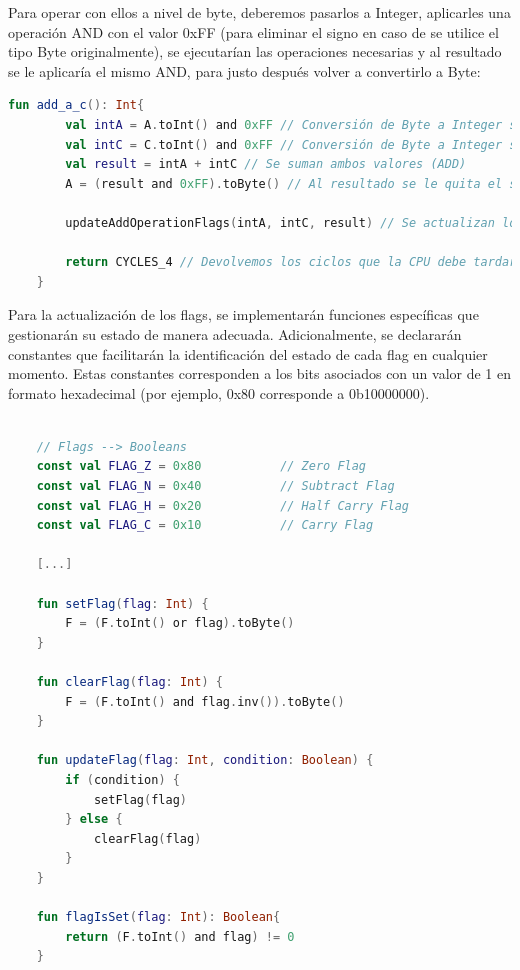 Para operar con ellos a nivel de byte, deberemos pasarlos a Integer, aplicarles una operación AND con el valor 0xFF (para eliminar el signo en caso de se utilice el tipo Byte originalmente), se ejecutarían las operaciones necesarias y al resultado se le aplicaría el mismo AND, para justo después volver a convertirlo a Byte:

\begin{lstlisting}[language=Kotlin, caption={Ejemplo de Opcode}, label={code:kotlinexample}]
    fun add_a_c(): Int{
        val intA = A.toInt() and 0xFF // Conversión de Byte a Integer sin signo -> A
        val intC = C.toInt() and 0xFF // Conversión de Byte a Integer sin signo -> C
        val result = intA + intC // Se suman ambos valores (ADD)
        A = (result and 0xFF).toByte() // Al resultado se le quita el signo por precaución y se convierte a Byte

        updateAddOperationFlags(intA, intC, result) // Se actualizan los Flags correspondientes

        return CYCLES_4 // Devolvemos los ciclos que la CPU debe tardar en ejecutar la instrucción
    }
\end{lstlisting}

Para la actualización de los flags, se implementarán funciones específicas que gestionarán su estado de manera adecuada. Adicionalmente, se declararán constantes que facilitarán la identificación del estado de cada flag en cualquier momento. Estas constantes corresponden a los bits asociados con un valor de 1 en formato hexadecimal (por ejemplo, 0x80 corresponde a 0b10000000).

\begin{lstlisting}[language=Kotlin, caption={Actualización de Flags}, label={code:kotlinflags}]

    // Flags --> Booleans
    const val FLAG_Z = 0x80           // Zero Flag
    const val FLAG_N = 0x40           // Subtract Flag
    const val FLAG_H = 0x20           // Half Carry Flag
    const val FLAG_C = 0x10           // Carry Flag

    [...]

    fun setFlag(flag: Int) {
        F = (F.toInt() or flag).toByte()
    }

    fun clearFlag(flag: Int) {
        F = (F.toInt() and flag.inv()).toByte()
    }

    fun updateFlag(flag: Int, condition: Boolean) {
        if (condition) {
            setFlag(flag)
        } else {
            clearFlag(flag)
        }
    }

    fun flagIsSet(flag: Int): Boolean{
        return (F.toInt() and flag) != 0
    }
\end{lstlisting}

